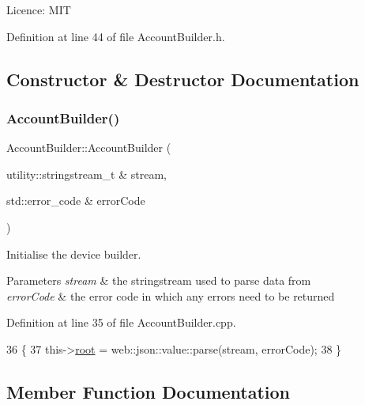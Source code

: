 Licence\+: M\+IT 

Definition at line 44 of file Account\+Builder.\+h.



\subsection{Constructor \& Destructor Documentation}
\mbox{\label{class_account_builder_ae19ca737d825f1ecc99e8406a19a0699}} 
\subsubsection{\texorpdfstring{Account\+Builder()}{AccountBuilder()}}
{\footnotesize\ttfamily Account\+Builder\+::\+Account\+Builder (\begin{DoxyParamCaption}\item[{utility\+::stringstream\+\_\+t \&}]{stream,  }\item[{std\+::error\+\_\+code \&}]{error\+Code }\end{DoxyParamCaption})}

Initialise the device builder.


\begin{DoxyParams}{Parameters}
{\em stream} & the stringstream used to parse data from \\
\hline
{\em error\+Code} & the error code in which any errors need to be returned \\
\hline
\end{DoxyParams}


Definition at line 35 of file Account\+Builder.\+cpp.


\begin{DoxyCode}
36 \{
37     this->\hyperlink{class_account_builder_a7fcd16decc7765ef0a5fbea02fa56877}{root} = web::json::value::parse(stream, errorCode);
38 \}
\end{DoxyCode}


\subsection{Member Function Documentation}
\mbox{\label{class_account_builder_af44cc9897467096f65d3bd768fd01300}} 
